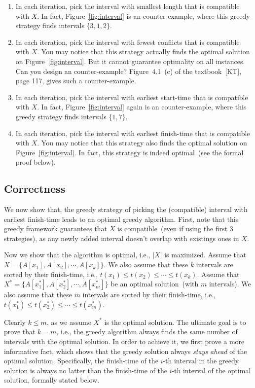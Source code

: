 \vspace*{-\topsep}
\begin{enumerate}
\item In each iteration, pick the interval with smallest length that is compatible with $X$.
In fact, Figure~\ref{fig:interval}
is an counter-example, where this greedy strategy finds intervals $\{3, 1, 2\}$.
\item In each iteration, pick the interval with fewest conflicts that is compatible with $X$.
You may notice that this strategy actually finds the optimal solution on Figure~\ref{fig:interval}.
But it cannot guarantee optimality on all instances. Can you design an counter-example?
Figure~4.1~(c) of the textbook~[KT], page 117, gives such a counter-example.
\item In each iteration, pick the interval with earliest start-time that is compatible with $X$.
In fact, Figure~\ref{fig:interval} again is an counter-example, where this greedy strategy finds intervals $\{1, 7\}$.
\item In each iteration, pick the interval with earliest finish-time that is compatible with $X$.
You may notice that this strategy also finds the optimal solution on Figure~\ref{fig:interval}.
In fact, this strategy is indeed optimal~(see the formal proof below).
\end{enumerate}

\subsection*{Correctness}

We now show that, the greedy strategy of picking the (compatible) interval with earliest finish-time leads
to an optimal greedy algorithm. First, note that this greedy framework guarantees 
that $X$ is compatible~(even if using the first 3 strategies),
as any newly added interval doesn't overlap with existings ones in $X$.

Now we show that the algorithm is optimal, i.e., $|X|$ is maximized.
Assume that $X = \{A[x_1], A[x_2], \cdots, A[x_k]\}$.
We also assume that these $k$ intervals are sorted by their finish-time, i.e., $t(x_1) \le t(x_2) \le \cdots \le t(x_k)$.
Assume that $X^* = \{A[x^*_1], A[x^*_2], \cdots, A[x^*_m]\}$ be an optimal solution~(with $m$ intervals).
We also assume that these $m$ intervals are sorted by their finish-time, i.e., $t(x^*_1) \le t(x^*_2) \le \cdots \le t(x^*_m)$.

Clearly $k \le m$, as we assume $X^*$ is the optimal solution.
The ultimate goal is to prove that $k = m$, i.e., the greedy algorithm always finds the
same number of intervals with the optimal solution.
In order to achieve it, we first prove a more informative fact,
which shows that the greedy solution always \emph{stays ahead}
of the optimal solution. Specifically,
the finish-time of the $i$-th interval in the greedy solution
is always no latter than the finish-time of the $i$-th interval of the optimal solution,
formally stated below.

